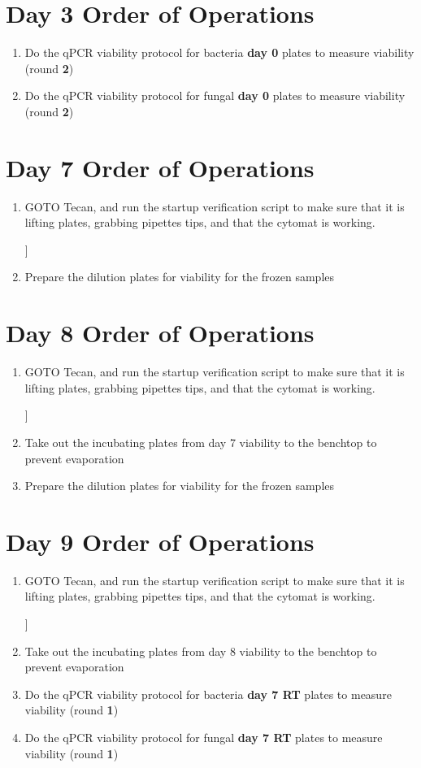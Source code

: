 \documentclass{article}
\newcounter{comments}
\newcommand{\amogh}[1]{{\addtocounter{comments}{1}}{\color{red}{[\textbf{TODO Amogh \thecomments :}\ #1}]}}
\begin{document}
\section*{Day 3 Order of Operations} \label{day1instructions}
\begin{enumerate}
    \item Do the qPCR viability protocol for bacteria \textbf{day 0} plates to measure viability (round \textbf{2})
    \item Do the qPCR viability protocol for fungal \textbf{day 0} plates to measure viability (round \textbf{2})
\end{enumerate}

\section*{Day 7 Order of Operations} \label{day7instructions}
\begin{enumerate}
    \item GOTO Tecan, and run the startup verification script to make sure that it is lifting plates, grabbing pipettes tips, and that the cytomat is working. \amogh{}
    \item Prepare the dilution plates for viability for the frozen samples
\end{enumerate}

\section*{Day 8 Order of Operations} \label{day8instructions}
\begin{enumerate}
    \item GOTO Tecan, and run the startup verification script to make sure that it is lifting plates, grabbing pipettes tips, and that the cytomat is working. \amogh{}
    \item Take out the incubating plates from day 7 viability to the benchtop to prevent evaporation
    \item Prepare the dilution plates for viability for the frozen samples
\end{enumerate}

\section*{Day 9 Order of Operations} \label{day8instructions}
\begin{enumerate}
    \item GOTO Tecan, and run the startup verification script to make sure that it is lifting plates, grabbing pipettes tips, and that the cytomat is working. \amogh{}
    \item Take out the incubating plates from day 8 viability to the benchtop to prevent evaporation
    \item Do the qPCR viability protocol for bacteria \textbf{day 7 RT} plates to measure viability (round \textbf{1})
    \item Do the qPCR viability protocol for fungal \textbf{day 7 RT} plates to measure viability (round \textbf{1})
\end{enumerate}
\end{document}
